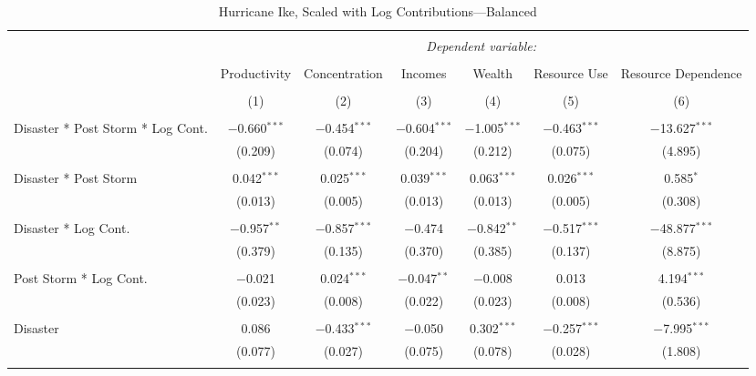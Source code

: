 
\begin{table}[!htbp] \centering 
  \caption{Hurricane Ike, Scaled with Log Contributions---Balanced} 
  \label{} 
\footnotesize 
\begin{tabular}{@{\extracolsep{5pt}}lcccccc} 
\\[-1.8ex]\hline 
\hline \\[-1.8ex] 
 & \multicolumn{6}{c}{\textit{Dependent variable:}} \\ 
\cline{2-7} 
\\[-1.8ex] & Productivity & Concentration & Incomes & Wealth & Resource Use & Resource Dependence \\ 
\\[-1.8ex] & (1) & (2) & (3) & (4) & (5) & (6)\\ 
\hline \\[-1.8ex] 
 Disaster * Post Storm * Log Cont. & $-$0.660$^{***}$ & $-$0.454$^{***}$ & $-$0.604$^{***}$ & $-$1.005$^{***}$ & $-$0.463$^{***}$ & $-$13.627$^{***}$ \\ 
  & (0.209) & (0.074) & (0.204) & (0.212) & (0.075) & (4.895) \\ 
  & & & & & & \\ 
 Disaster * Post Storm & 0.042$^{***}$ & 0.025$^{***}$ & 0.039$^{***}$ & 0.063$^{***}$ & 0.026$^{***}$ & 0.585$^{*}$ \\ 
  & (0.013) & (0.005) & (0.013) & (0.013) & (0.005) & (0.308) \\ 
  & & & & & & \\ 
 Disaster * Log Cont. & $-$0.957$^{**}$ & $-$0.857$^{***}$ & $-$0.474 & $-$0.842$^{**}$ & $-$0.517$^{***}$ & $-$48.877$^{***}$ \\ 
  & (0.379) & (0.135) & (0.370) & (0.385) & (0.137) & (8.875) \\ 
  & & & & & & \\ 
 Post Storm *  Log Cont. & $-$0.021 & 0.024$^{***}$ & $-$0.047$^{**}$ & $-$0.008 & 0.013 & 4.194$^{***}$ \\ 
  & (0.023) & (0.008) & (0.022) & (0.023) & (0.008) & (0.536) \\ 
  & & & & & & \\ 
 Disaster & 0.086 & $-$0.433$^{***}$ & $-$0.050 & 0.302$^{***}$ & $-$0.257$^{***}$ & $-$7.995$^{***}$ \\ 
  & (0.077) & (0.027) & (0.075) & (0.078) & (0.028) & (1.808) \\ 
  & & & & & & \\ 

\end{tabular}
\end{table}
